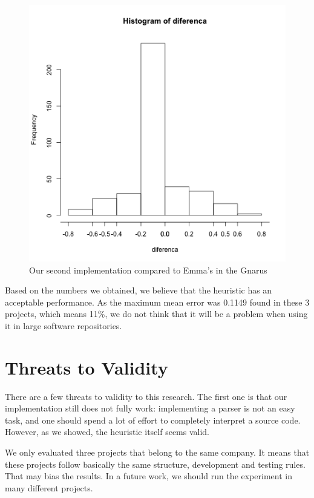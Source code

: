 \documentclass{sig-alternate}
\begin{document}
\begin{figure}[h!H]
  \centering
  \includegraphics[scale=0.3]{../stats/gnarus-histograma-aspectj.png}
  \caption{Our second implementation compared to Emma's in the Gnarus}
  \label{fig:gnarus-aj}
\end{figure}

Based on the numbers we obtained, we believe that the heuristic has an acceptable performance. 
As the maximum mean error was 0.1149 found in these 3 projects, which means 11\%, 
we do not think that it will be a problem when using it in large software repositories.

\section{Threats to Validity}
\label{sec-threats}

There are a few threats to validity to this research. The first one is that our implementation
still does not fully work: implementing a parser is not an easy task, and one should spend
a lot of effort to completely interpret a source code. 
However, as we showed, the heuristic itself seems valid. 

We only evaluated three projects that belong to the same company. It means that these projects
follow basically the same structure, development and testing rules. That may bias the results.
In a future work, we should run the experiment in many different projects.
\end{document}
